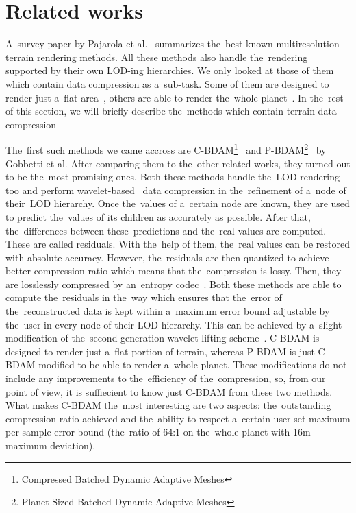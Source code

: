 \chapter{Related works}\label{chap:related_works}

 A~survey paper by Pajarola et al.~\cite{survey} summarizes the~best known multiresolution terrain rendering methods. All these methods also handle the~rendering supported by their own LOD-ing hierarchies. We only looked at those of them which contain data compression as a~sub-task. Some of them are designed to render just a~flat area~\cite{cbdam, jpeg2000terrain, meshesGPU1, meshesGPU2}, others are able to render the~whole planet~\cite{pbdam, meshes}. In the~rest of this section, we will briefly describe the~methods which contain terrain data compression
 
 The~first such methods we came accross are C-BDAM\footnote{Compressed Batched Dynamic Adaptive Meshes}~\cite{cbdam} and P-BDAM\footnote{Planet Sized Batched Dynamic Adaptive Meshes}~\cite{pbdam} by  Gobbetti et al. After comparing them to the~other related works, they turned out to be the~most promising ones. Both these methods handle the~LOD rendering too and perform wavelet-based~\cite{waveletsTutorial} data compression in the~refinement of a~node of their~LOD hierarchy. Once the~values of a~certain node are known, they are used to predict the~values of its children as accurately as possible. After that, the~differences between these~predictions and the~real values are computed. These are called residuals. With the~help of them, the~real values can be restored with absolute accuracy. However, the~residuals are then quantized to achieve better compression ratio which means that the~compression is lossy. Then, they are losslessly compressed by an~entropy codec~\cite{entropy1, entropy2}. Both these methods are able to compute the~residuals in the~way which ensures that the~error of the~reconstructed data is kept within a~maximum error bound adjustable by the~user in every node of their LOD hierarchy. This can be achieved by a~slight modification of the~second-generation wavelet lifting scheme~\cite{two-stage}. C-BDAM is designed to render just a~flat portion of terrain, whereas P-BDAM is just C-BDAM modified to be able to render a~whole planet. These modifications do not include any improvements to the~efficiency of the~compression, so, from our point of view, it is suffiecient to know just C-BDAM from these two methods. What makes C-BDAM the~most interesting are two aspects: the~outstanding compression ratio achieved and the~ability to respect a~certain user-set maximum per-sample error bound (the~ratio of 64:1 on the~whole planet with 16m maximum deviation).
 
